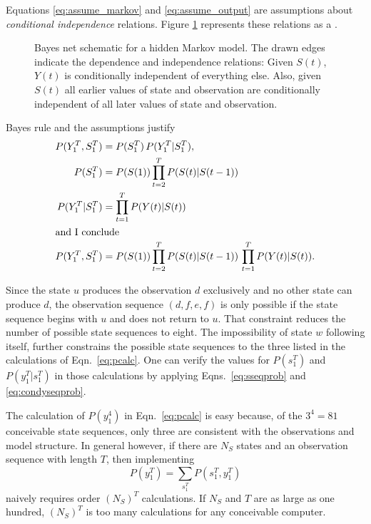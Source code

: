 \documentclass[]{article}
\newcommand{\ts}[3]{#1_{#2}^{#3}}                    %
\newcommand{\ti}[2]{{#1}{(#2)}}                  %
\newcommand{\plotsize}{%
  \fontsize{9}{9}%
  \selectfont}
\renewcommand{\comment}[1]{}
\begin{document}
Equations \eqref{eq:assume_markov} and \eqref{eq:assume_output} are
assumptions about \emph{conditional independence} relations.  Figure
\ref{fig:dhmm_net} represents these relations as a %
\emph{}.

\begin{figure}[htbp]
  \centering{\plotsize%
    
  }
  \caption[\comment{fig:dhmm-net }Bayes net schematic for a hidden Markov model.]%
  {Bayes net schematic for a hidden Markov model.  The drawn edges
    indicate the dependence and independence relations: Given
    $\ti{S}{t}$, $\ti{Y}{t}$ is conditionally independent of
    everything else.  Also, given $\ti{S}{t}$ all earlier values of
    state and observation are conditionally independent of all later
    values of state and observation.}
  \label{fig:dhmm_net}
\end{figure}

Bayes rule and the assumptions justify
\begin{align}
  P(\ts{Y}{1}{T},\ts{S}{1}{T}) &= P(\ts{S}{1}{T}) \, %
                                   P(\ts{Y}{1}{T}|\ts{S}{1}{T}),\notag\\
  \label{eq:sseqprob}%
  P(\ts{S}{1}{T})              &= P(\ti{S}{1}) %
                                   \prod_{t=2}^T P(\ti{S}{t}|\ti{S}{t-1})\\
  \label{eq:condyseqprob}%
  P(\ts{Y}{1}{T}|\ts{S}{1}{T}) &= \prod_{t=1}^T P(\ti{Y}{t}|\ti{S}{t})\\
  \intertext{and I conclude}
  P(\ts{Y}{1}{T},\ts{S}{1}{T}) &= P(\ti{S}{1}) %
                                   \prod_{t=2}^T P(\ti{S}{t}|\ti{S}{t-1})\, %
                                   \prod_{t=1}^T P(\ti{Y}{t}|\ti{S}{t}).\notag
\end{align}

Since the state $u$ produces the observation $d$ exclusively and no
other state can produce $d$, the observation sequence $(d,f,e,f)$ is
only possible if the state sequence begins with $u$ and does not
return to $u$.  That constraint reduces the number of possible state
sequences to eight.  The impossibility of state $w$ following itself,
further constrains the possible state sequences to the three listed in
the calculations of Eqn.~\eqref{eq:pcalc}.  One can verify the values
for $P(\ts{s}{1}{T})$ and $P(\ts{y}{1}{T}|\ts{s}{1}{T})$ in those
calculations by applying Eqns.~\eqref{eq:sseqprob} and
\eqref{eq:condyseqprob}.

The calculation of $P(\ts{y}{1}{4})$ in Eqn.~\eqref{eq:pcalc} is easy
because, of the $3^4 = 81$ conceivable state sequences, only three are
consistent with the observations and model structure.  In general
however, if there are $N_S$ states and an observation sequence with
length $T$, then implementing
\begin{equation*}
  P(\ts{y}{1}{T}) = \sum_{\ts{s}{1}{T}} P\left(\ts{s}{1}{T}
    ,\ts{y}{1}{T} \right)
\end{equation*}
naively requires order $\left(N_S\right)^T$ calculations.  If $N_S$
and $T$ are as large as one hundred, $\left(N_S\right)^T$ is too many
calculations for any conceivable computer.
\end{document}
